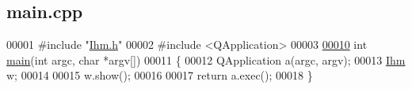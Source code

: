\hypertarget{main_8cpp_source}{}\subsection{main.\+cpp}
\label{main_8cpp_source}

\begin{DoxyCode}
00001 \textcolor{preprocessor}{#include "\hyperlink{_ihm_8h}{Ihm.h}"}
00002 \textcolor{preprocessor}{#include <QApplication>}
00003 
\hyperlink{main_8cpp_a0ddf1224851353fc92bfbff6f499fa97}{00010} \textcolor{keywordtype}{int} \hyperlink{main_8cpp_a0ddf1224851353fc92bfbff6f499fa97}{main}(\textcolor{keywordtype}{int} argc, \textcolor{keywordtype}{char} *argv[])
00011 \{
00012     QApplication a(argc, argv);
00013     \hyperlink{class_ihm}{Ihm} w;
00014 
00015     w.show();
00016 
00017     \textcolor{keywordflow}{return} a.exec();
00018 \}
\end{DoxyCode}
